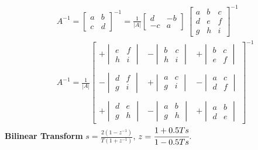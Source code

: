 \begin{align*}
& A^{-1} = \begin{bmatrix}
a & b \\
c & d
\end{bmatrix}^{-1}= \frac{1}{|A|}\begin{bmatrix}
d & -b \\
-c & a
\end{bmatrix} \ \begin{bmatrix}
a & b & c \\
d & e & f \\
g & h & i
\end{bmatrix}^{-1} \\
& A^{-1} = 
\frac{1}{|A|}\begin{bmatrix}
+\begin{vmatrix}
e & f \\
h & i
\end{vmatrix} & 
-\begin{vmatrix}
b & c \\
h & i
\end{vmatrix} & 
+\begin{vmatrix}
b & c \\
e & f
\end{vmatrix} \\
& & \\
-\begin{vmatrix}
d & f \\
g & i
\end{vmatrix} & +\begin{vmatrix}
a & c \\
g & i
\end{vmatrix} &
-\begin{vmatrix}
a & c \\
d & f
\end{vmatrix} \\
& & \\
+\begin{vmatrix}
d & e \\
g & h
\end{vmatrix} &
-\begin{vmatrix}
a & b \\
g & h
\end{vmatrix} &
+\begin{vmatrix}
a & b \\
d & e
\end{vmatrix}
\end{bmatrix}^{-1}
\end{align*}
\textbf{Bilinear Transform}  \hfill \nopagebreak
$s= \frac{2(1-z^{-1})}{T(1+z^{-1})}$, $z=\cfrac{1+0.5Ts}{1-0.5Ts}$.

